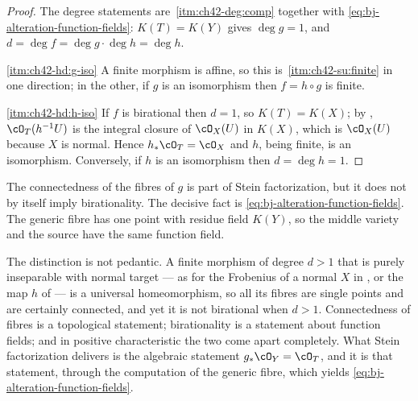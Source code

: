 \begin{proof}
The degree statements are
\,\cref{itm:ch42-deg:comp} together with
\eqref{eq:bj-alteration-function-fields}: $K(T)=K(Y)$ gives
$\deg g=1$, and $d=\deg f=\deg g\cdot\deg h=\deg h$.

\cref{itm:ch42-hd:g-iso}  A finite morphism is affine, so this is
\,\cref{itm:ch42-su:finite} in one direction;
in the other, if $g$ is an isomorphism then $f=h\circ g$ is finite.

\cref{itm:ch42-hd:h-iso}  If $f$ is birational then $d=1$, so
$K(T)=K(X)$; by , $\cO_T(h^{-1}U)$
is the integral closure of $\cO_X(U)$ in $K(X)$, which is
$\cO_X(U)$ because $X$ is normal.  Hence $h_*\cO_T=\cO_X$ and $h$,
being finite, is an isomorphism.  Conversely, if $h$ is an isomorphism then
$d=\deg h=1$.
\end{proof}

\begin{remark}
\label{rem:ch42-connected-not-birational}
The connectedness of the fibres of $g$ is part of Stein factorization, but
it does not by itself imply birationality.
The decisive fact is \eqref{eq:bj-alteration-function-fields}.
The generic fibre has one point with residue field $K(Y)$, so the middle
variety and the source have the same function field.

The distinction is not pedantic.  A finite morphism of degree $d>1$ that is
purely inseparable with normal target --- as for the Frobenius
of a normal $X$ in , or the map
$h$ of  --- is a universal homeomorphism, so all its
fibres are single points and are certainly connected, and yet it is not birational when $d>1$.  Connectedness of
fibres is a topological statement; birationality is a statement about
function fields; and in positive characteristic the two come apart
completely.  What Stein factorization delivers is the algebraic statement
$g_*\cO_Y=\cO_T$, and it is that statement, through the computation of the
generic fibre, which yields \eqref{eq:bj-alteration-function-fields}.
\end{remark}

